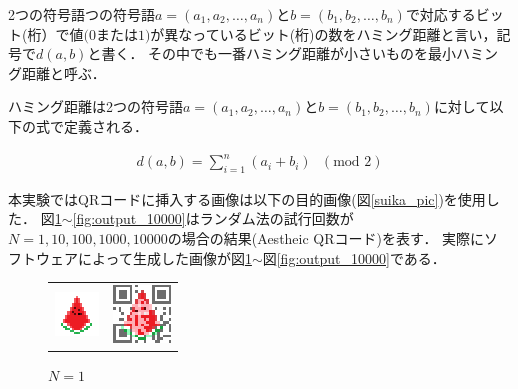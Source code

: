 \documentclass{thesis}
\begin{document}
2つの符号語つの符号語$a=(a_1,a_2,…,a_n)$と$b=(b_1,b_2,…,b_n)$で対応するビット(桁）で値$(0$または$1)$が異なっているビット(桁)の数をハミング距離と言い，記号で$d(a,b)$と書く．
その中でも一番ハミング距離が小さいものを最小ハミング距離と呼ぶ．

ハミング距離は2つの符号語$a=(a_1,a_2,…,a_n)$と$b=(b_1,b_2,…,b_n)$に対して以下の式で定義される．

\begin{eqnarray}
d(a,b)=\sum_{i=1}^{n}(a_{i}+b_{i})\mbox{ }(\mbox{mod } 2)
\end{eqnarray}

本実験ではQRコードに挿入する画像は以下の目的画像(図\ref{suika_pic})を使用した．
図\ref{fig:output_1}$\sim$\ref{fig:output_10000}はランダム法の試行回数が$N=1,10,100,1000,10000$の場合の結果(Aestheic QRコード)を表す．
実際にソフトウェアによって生成した画像が図\ref{fig:output_1}$\sim$図\ref{fig:output_10000}である．

\begin{figure}[H]
  \begin{tabular}{cc}
    \begin{minipage}[t]{0.45\hsize}
      \centering
      \includegraphics[width=0.5\linewidth]{pic/suika.eps}
      \caption{目的画像}
      \label{suika_pic}
    \end{minipage} &
    \begin{minipage}[t]{0.45\hsize}
    \centering
      \includegraphics[width=0.5\linewidth]{pic/Tahara_1_70.eps}
       \caption{$N=1$}
      \label{fig:output_1}
      \end{minipage}
  \end{tabular}
\end{figure}
\end{document}
